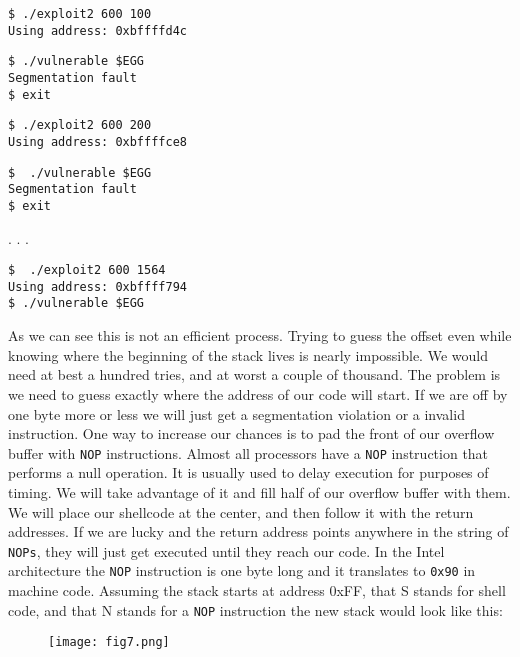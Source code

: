 \documentclass[a4paper]{article}
\begin{document}
\begin{lstlisting}[style=DOS]
$ ./exploit2 600 100
Using address: 0xbffffd4c
\end{lstlisting}

\begin{lstlisting}[style=DOS]
$ ./vulnerable $EGG
Segmentation fault
$ exit
\end{lstlisting}

\begin{lstlisting}[style=DOS]
$ ./exploit2 600 200
Using address: 0xbffffce8
\end{lstlisting}

\begin{lstlisting}[style=DOS]
$  ./vulnerable $EGG
Segmentation fault
$ exit
\end{lstlisting}

.
.
.

\begin{lstlisting}[style=DOS]
$  ./exploit2 600 1564
Using address: 0xbffff794
$ ./vulnerable $EGG
\end{lstlisting}

As we can see this is not an efficient process. Trying to guess the offset even while knowing where the beginning of the stack lives is nearly impossible. We would need at best a hundred tries, and at worst a couple of thousand. The problem is we need to guess exactly where the address of our code will start. If we are off by one byte more or less we will just get a segmentation violation or a invalid instruction. One way to increase our chances is to pad the front of our overflow buffer with \texttt{NOP} instructions. Almost all processors have a \texttt{NOP} instruction that performs a null operation. It is usually used to delay execution for purposes of timing. We will take advantage of it and fill half of our overflow buffer with them. We will place our shellcode at the center, and then follow it with the return addresses. If we are lucky and the return address points anywhere in the string of \texttt{NOPs}, they will just get executed until they reach our code. In the Intel architecture the \texttt{NOP} instruction is one byte long and it translates to \texttt{0x90} in machine code. Assuming the stack starts at address 0xFF, that S stands for shell code, and that N stands for a \texttt{NOP} instruction the new stack would look like this:

\begin{figure}[H]
\centering
\texttt{[image: fig7.png]}
\end{figure}
\end{document}
